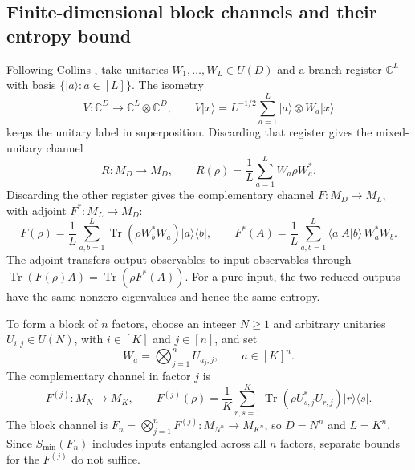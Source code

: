 \documentclass[11pt]{article}
\numberwithin{equation}{section}
\theoremstyle{boldremark}\newtheorem{remark}[theorem]{Remark}
\DeclareMathOperator{\Tr}{Tr}
\newcommand{\C}{\mathbb C}
\newcommand{\M}{M}
\newcommand{\smin}{S_{\min}}
\newcommand{\ket}[1]{\lvert #1\rangle}
\newcommand{\bra}[1]{\langle #1\rvert}
\begin{document}
\subsection{Finite-dimensional block channels and their entropy bound}
\label{sec:finite-entropy}

Following Collins \cite[Section~3.1]{Collins}, take unitaries
$W_1,\ldots,W_L\in U(D)$ and a branch register $\C^L$ with basis
$\{\ket a:a\in[L]\}$. The isometry
\[
 V:\C^D\longrightarrow\C^L\otimes\C^D,
 \qquad V\ket x=L^{-1/2}\sum_{a=1}^L\ket a\otimes W_a\ket x
\]
keeps the unitary label in superposition. Discarding that register
gives the mixed-unitary channel
\[
 R:\M_D\longrightarrow\M_D,
 \qquad R(\rho)=\frac1L\sum_{a=1}^L W_a\rho W_a^*.
\]
Discarding the other register gives the complementary channel
$F:\M_D\to\M_L$, with adjoint $F^*:\M_L\to\M_D$:
\begin{equation}
 F(\rho)=\frac1L\sum_{a,b=1}^L
       \Tr(\rho W_b^*W_a)\ket a\bra b,\qquad
 F^*(A)=\frac1L\sum_{a,b=1}^L\bra a A\ket b\,W_a^*W_b.
 \label{eq:gram}
\end{equation}
The adjoint transfers output observables to input observables through
$\Tr(F(\rho)A)=\Tr(\rho F^*(A))$. For a pure input, the two reduced
outputs have the same nonzero eigenvalues and hence the same entropy.

To form a block of $n$ factors, choose an integer $N\ge1$ and arbitrary unitaries
$U_{i,j}\in U(N)$, with $i\in[K]$ and $j\in[n]$, and set
\begin{equation}
 W_a=\bigotimes_{j=1}^n U_{a_j,j},\qquad a\in[K]^n.
 \label{eq:tensor-words}
\end{equation}
The complementary channel in factor $j$ is
\[
 F^{(j)}:\M_N\longrightarrow\M_K,\qquad
 F^{(j)}(\rho)=\frac1K\sum_{r,s=1}^K
 \Tr(\rho U_{s,j}^*U_{r,j})\ket r\bra s.
\]
The block channel is
$F_n=\bigotimes_{j=1}^n F^{(j)}:\M_{N^n}\to\M_{K^n}$, so
$D=N^n$ and $L=K^n$. Since $\smin(F_n)$ includes inputs
entangled across all $n$ factors, separate bounds for the $F^{(j)}$
do not suffice.
\end{document}
